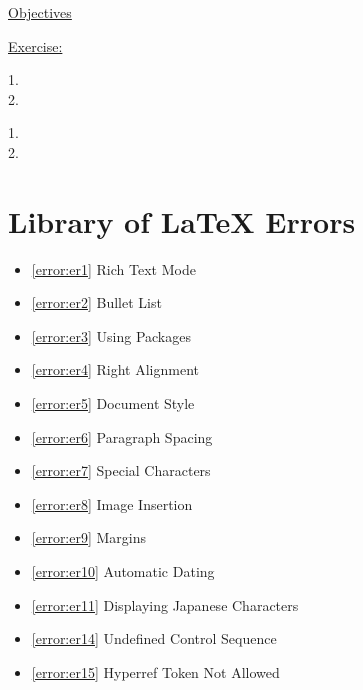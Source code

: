 \documentclass[12pt]{article}
\begin{document}
\underline{Objectives}



\color{black}
\vspace{1em}



\vspace{0.5em}
\begin{addmargin}[1cm]{0cm}
\color{gray}
\underline{Exercise:}

1. 
\\2. 

\color{black}\vspace{0.5em}

1.
\\2.

\end{addmargin}






\newpage\section{Library of LaTeX Errors}
\begin{itemize}
\renewcommand{\labelitemi}{}
    \item \ref{error:er1} Rich Text Mode 
    \item \ref{error:er2} Bullet List 
    \item \ref{error:er3} Using Packages
    \item \ref{error:er4} Right Alignment
    \item \ref{error:er5} Document Style
    \item \ref{error:er6} Paragraph Spacing
    \item \ref{error:er7} Special Characters
    \item \ref{error:er8} Image Insertion
    \item \ref{error:er9} Margins
    \item \ref{error:er10} Automatic Dating
    \item \ref{error:er11} Displaying Japanese Characters
    \item \ref{error:er14} Undefined Control Sequence
    \item \ref{error:er15} Hyperref Token Not Allowed
\end{itemize}
\end{document}
